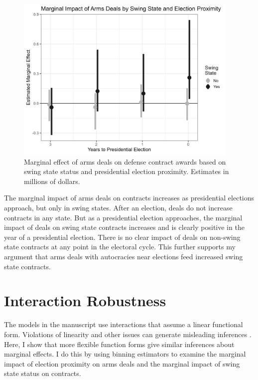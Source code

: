 \documentclass[12pt]{article}
\begin{document}
\begin{figure}[htpb]
	\centering
		\includegraphics[width=0.95\textwidth]{deals-me-prox.png}
	\caption{Marginal effect of arms deals on defense contract awards based on swing state status and presidential election proximity. Estimates in millions of dollars.}
	\label{fig:deals-me-prox}
\end{figure}


The marginal impact of arms deals on contracts increases as presidential elections approach, but only in swing states. 
After an election, deals do not increase contracts in any state. 
But as a presidential election approaches, the marginal impact of deals on swing state contracts increases and is clearly positive in the year of a presidential election. 
There is no clear impact of deals on non-swing state contracts at any point in the electoral cycle. 
This further supports my argument that arms deals with autocracies near elections feed increased swing state contracts. 


\section{Interaction Robustness}

The models in the manuscript use interactions that assume a linear functional form. 
Violations of linearity and other issues can generate misleading inferences \citep{Hainmuelleretal2019}. 
Here, I show that more flexible function forms give similar inferences about marginal effects. 
I do this by using binning estimators to examine the marginal impact of election proximity on arms deals and the marginal impact of swing state status on contracts.
\end{document}
